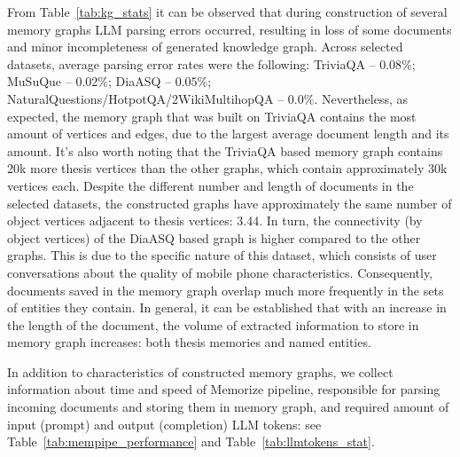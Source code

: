 From Table~\ref{tab:kg_stats} it can be observed that during construction of several memory graphs LLM parsing errors occurred, resulting in loss of some documents and minor incompleteness of generated knowledge graph. Across selected datasets, average parsing error rates were the following: TriviaQA -- $0.08\%$; MuSuQue -- $0.02\%$; DiaASQ -- $0.05\%$; NaturalQuestions/HotpotQA/2WikiMultihopQA -- $0.0\%$. Nevertheless, as expected, the memory graph that was built on TriviaQA contains the most amount of vertices and edges, due to the largest average document length and its amount. It's also worth noting that the TriviaQA based memory graph contains 20k more thesis vertices than the other graphs, which contain approximately 30k vertices each. Despite the different number and length of documents in the selected datasets, the constructed graphs have approximately the same number of object vertices adjacent to thesis vertices: 3.44. In turn, the connectivity (by object vertices) of the DiaASQ based graph is higher compared to the other graphs. This is due to the specific nature of this dataset, which consists of user conversations about the quality of mobile phone characteristics. Consequently, documents saved in the memory graph overlap much more frequently in the sets of entities they contain. In general, it can be established that with an increase in the length of the document, the volume of extracted information to store in memory graph increases: both thesis memories and named entities.

In addition to characteristics of constructed memory graphs, we collect information about time and speed of Memorize pipeline, responsible for parsing incoming documents and storing them in memory graph, and required amount of input (prompt) and output (completion) LLM tokens: see Table~\ref{tab:mempipe_performance} and Table~\ref{tab:llmtokens_stat}.

